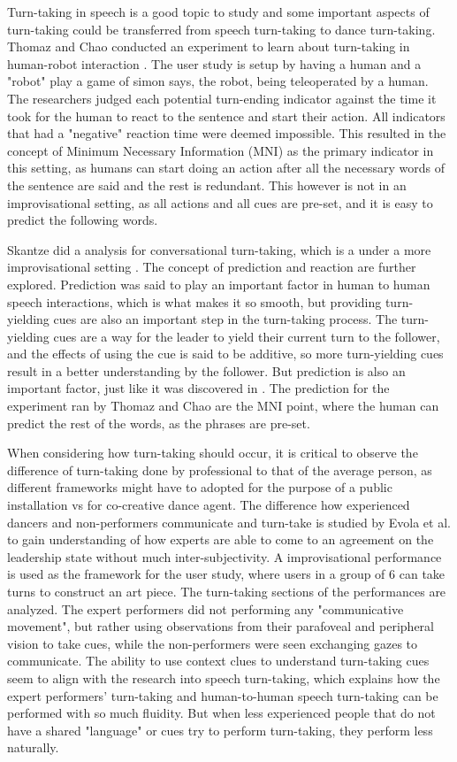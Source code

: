 Turn-taking in speech is a good topic to study and some important
aspects of turn-taking could be transferred from speech turn-taking to
dance turn-taking. 
Thomaz and Chao conducted an experiment to learn about
turn-taking in human-robot interaction \cite{Thomaz2011}. The user study is setup by having a human and a
"robot" play a game of simon says, the robot, being teleoperated by a human. The researchers judged each
potential turn-ending indicator against the time it took for the human
to react to the sentence and start their action. All indicators that had
a "negative" reaction time were deemed impossible. This
resulted in the concept of Minimum Necessary Information (MNI) as the
primary indicator in this setting, as humans can start doing an action
after all the necessary words of the sentence are said and the rest is
redundant. This however is not in an improvisational setting, as all
actions and all cues are pre-set, and it is easy to predict the
following words. 

Skantze did a analysis for conversational turn-taking, which is a under
a more improvisational setting \cite{Skantze2021}. The concept of prediction and reaction
are further explored. Prediction was said to play an important factor in
human to human speech interactions, which is what makes it so smooth,
but providing turn-yielding cues are also an important step in the
turn-taking process. The turn-yielding cues are a way for the leader to
yield their current turn to the follower, and the effects of using the
cue is said to be additive, so more turn-yielding cues result in a
better understanding by the follower. But prediction is also an
important factor, just like it was discovered in \cite{Thomaz2011}. The
prediction for the experiment ran by Thomaz and Chao are the MNI point,
where the human can predict the rest of the words, as the phrases are
pre-set.

When considering how turn-taking should occur, it is critical to observe
the difference of turn-taking done by professional to that of the
average person, as different frameworks might have to adopted for the
purpose of a public installation vs for co-creative dance agent. 
The difference how experienced dancers and non-performers communicate
and turn-take is studied by Evola et al. to gain understanding of how
experts are able to come to an agreement on the leadership state without
much inter-subjectivity. A improvisational performance
is used as the framework for the user study, where users in a group of 6
can take turns to construct an art piece. 
The turn-taking sections of the performances are analyzed.
The expert performers did not performing any "communicative movement", but
rather using observations from their parafoveal and peripheral
vision to take cues, while the non-performers were seen exchanging gazes to
communicate. The ability to use context clues to understand turn-taking
cues seem to align with the research into speech turn-taking, which
explains how the expert performers' turn-taking and human-to-human speech
turn-taking can be performed with so much fluidity. But when less experienced
people that do not have a shared "language" or cues try to perform turn-taking,
they perform less naturally.

